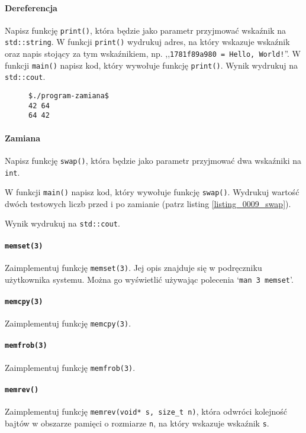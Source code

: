 \documentclass[11pt,a4paper,titlepage,onecolumn]{article}
\begin{document}
\paragraph{Dereferencja}  Napisz funkcję \texttt{print()}, która będzie
jako parametr przyjmować wskaźnik na \texttt{std::string}. W funkcji
\texttt{print()} wydrukuj adres, na który wskazuje wskaźnik oraz napis stojący
za tym wskaźnikiem, np. ,,\texttt{1781f89a980 = Hello, World!}''. W funkcji
\texttt{main()} napisz kod, który wywołuje funkcję \texttt{print()}.
Wynik wydrukuj na \texttt{std::cout}.

\begin{figure}[!htp]
\begin{lstlisting}[caption={zamiana},
    captionpos=b,
    label=listing_0009_swap]
$./program-zamiana$
42 64
64 42
\end{lstlisting}
\end{figure}

\paragraph{Zamiana} Napisz funkcję \texttt{swap()}, która będzie
jako parametr przyjmować dwa wskaźniki na \texttt{int}.

W funkcji \texttt{main()} napisz kod, który wywołuje funkcję \texttt{swap()}.
Wydrukuj wartość dwóch testowych liczb przed i po zamianie (patrz listing
\ref{listing_0009_swap}).

Wynik wydrukuj na \texttt{std::cout}.

\paragraph{\texttt{memset(3)}} Zaimplementuj funkcję \texttt{memset(3)}. Jej
opis znajduje się w podręczniku użytkownika systemu. Można go wyświetlić
używając polecenia `\texttt{man 3 memset}'.

\paragraph{\texttt{memcpy(3)}} Zaimplementuj funkcję \texttt{memcpy(3)}.

\paragraph{\texttt{memfrob(3)}} Zaimplementuj funkcję \texttt{memfrob(3)}.

\paragraph{\texttt{memrev()}} Zaimplementuj funkcję \texttt{memrev(void* s,
size\_t n)}, która odwróci kolejność bajtów w obszarze pamięci o rozmiarze
\texttt{n}, na który wskazuje wskaźnik \texttt{s}.
\end{document}
